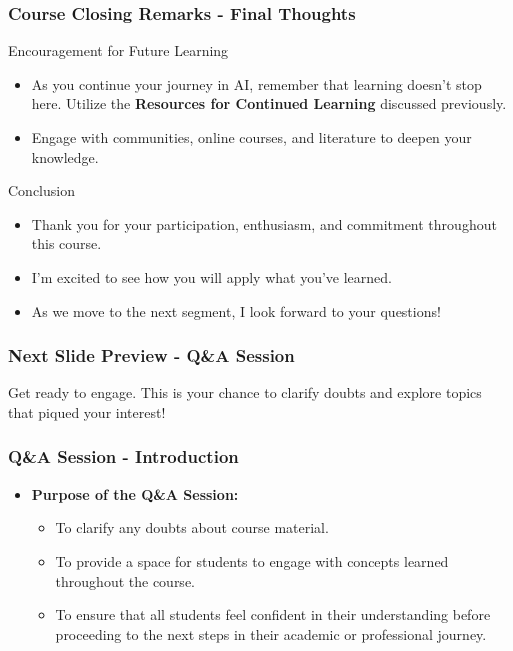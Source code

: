\documentclass[aspectratio=169]{beamer}
\begin{document}
\begin{frame}[fragile]
    \frametitle{Course Closing Remarks - Final Thoughts}
    \begin{block}{Encouragement for Future Learning}
        \begin{itemize}
            \item As you continue your journey in AI, remember that learning doesn’t stop here. Utilize the \textbf{Resources for Continued Learning} discussed previously.
            \item Engage with communities, online courses, and literature to deepen your knowledge.
        \end{itemize}
    \end{block}

    \begin{block}{Conclusion}
        \begin{itemize}
            \item Thank you for your participation, enthusiasm, and commitment throughout this course.
            \item I'm excited to see how you will apply what you’ve learned.
            \item As we move to the next segment, I look forward to your questions!
        \end{itemize}
    \end{block}
\end{frame}

\begin{frame}[fragile]
    \frametitle{Next Slide Preview - Q\&A Session}
    Get ready to engage. This is your chance to clarify doubts and explore topics that piqued your interest!
\end{frame}

\begin{frame}[fragile]
    \frametitle{Q\&A Session - Introduction}
    \begin{itemize}
        \item \textbf{Purpose of the Q\&A Session:}
        \begin{itemize}
            \item To clarify any doubts about course material.
            \item To provide a space for students to engage with concepts learned throughout the course.
            \item To ensure that all students feel confident in their understanding before proceeding to the next steps in their academic or professional journey.
        \end{itemize}
    \end{itemize}
\end{frame}
\end{document}
